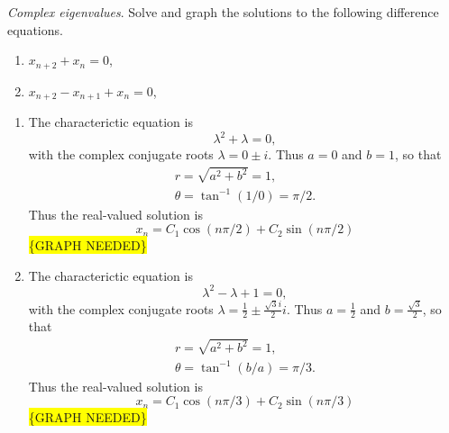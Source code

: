 \documentclass[
    classnum=MATH564,
    classname=MATHEMATICAL\ MODELING,
    due=January\ 28\,\ 2020,
    author=Gabrielle\ Streeter\qquad Hannah\ Wu\qquad\ Minghang\ Li,
    authorshort=Streeter\ \&\ Wu\ \&\ Li,
    teacher= Zachary\ M.\ Boyd,
    hw=1
]{hw-template}
\newcommand{\requiregraph}{\colorbox{yellow}{\{GRAPH NEEDED\}}}
\begin{document}
\begin{homeworkProblem}
\textit{Complex eigenvalues}. Solve and graph the  solutions to the following
difference equations.
\begin{enumerate}
    \item $x_{n+2} + x_n = 0$,
    \item $x_{n+2} - x_{n+1} + x_n = 0$,
\end{enumerate}

\segline

\solution

\begin{enumerate}
    \item The characterictic equation is \[
        \lambda^2 + \lambda = 0,
    \]
    with the complex conjugate roots $\lambda = 0 \pm i$. Thus $a = 0$ and $b = 1$,
    so that \[
        \begin{aligned}
            r = \sqrt{a^2 + b^2} = 1,\\
            \theta = \tan^{-1}(1/0) = \pi/2.
        \end{aligned}
    \]
    Thus the real-valued solution is \[
        x_n = C_1 \cos (n\pi/2) + C_2 \sin (n\pi/2)
    \]
    \requiregraph

    \item The characterictic equation is \[
        \lambda^2 - \lambda + 1 = 0,
    \]
    with the complex conjugate roots $\lambda = \frac{1}{2} \pm \frac{\sqrt{3}i}{2}i$.
    Thus $a = \frac{1}{2}$ and $b = \frac{\sqrt{3}}{2}$,
    so that \[
        \begin{aligned}
            r = \sqrt{a^2 + b^2} = 1,\\
            \theta = \tan^{-1}(b/a) = \pi/3.
        \end{aligned}
    \]
    Thus the real-valued solution is \[
        x_n = C_1 \cos (n\pi/3) + C_2 \sin (n\pi/3)
    \]
    \requiregraph

\end{enumerate}
\end{homeworkProblem}

\pagebreak
\end{document}
